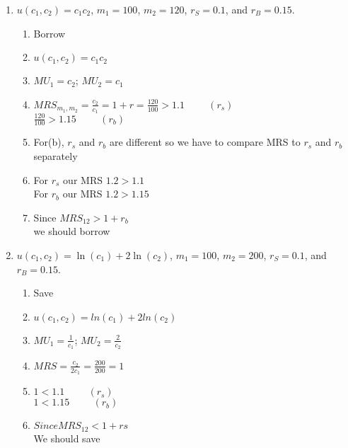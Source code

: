 \documentclass[11pt]{article}
\begin{document}
\begin{enumerate}
\begin{enumerate}
        \item $u(c_{1},c_{2})=c_{1}c_{2}$, $m_{1}=100$, $m_{2}=120$, $r_{S}=0.1$, and $r_{B}=0.15$.
        \begin{enumerate}
            \item Borrow
            \item $u(c_1,c_2) =c_1c_2$
            \item $MU_1 = c_2$; $MU_2 = c_1$
            \item $MRS_{{m_1},{m_2}} = \frac{c_2}{c_1} = 1 + r = \frac{120}{100} > 1.1 \hspace{1cm} (r_s)$ \\
            $\frac{120}{100} > 1.15 \hspace{1cm} (r_b)$
            \item For(b), $r_s$ and $r_b$ are different so we have to compare MRS to $r_s$ and $r_b$ separately
            \item For $r_s$ our MRS $1.2 > 1.1$\\
            For $r_b$ our MRS $1.2 > 1.15$
            \item Since $MRS_{12} > 1+r_b$\\
            we should borrow
        \end{enumerate}

        \item $u(c_{1},c_{2})=\ln(c_{1})+2\ln(c_{2})$, $m_{1}=100$, $m_{2}=200$, $r_{S}=0.1$, and $r_{B}=0.15$.
        \begin{enumerate}
            \item Save
            \item $u(c_1,c_2) = ln(c_1) + 2ln(c_2)$
            \item $MU_1 = \frac{1}{c_1}$; $MU_2 = \frac{2}{c_2}$
            \item $MRS = \frac{c_2}{2c_1} = \frac{200}{200} = 1$
            \item $1<1.1 \hspace{1cm}(r_s)$\\
            $1<1.15 \hspace{1cm}(r_b)$
            \item $Since MRS_{12} < 1+rs$
            \\We should save
        \end{enumerate}


\end{enumerate}
\end{enumerate}
\end{document}
